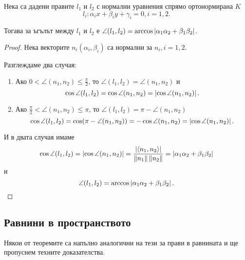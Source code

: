 \documentclass[numbers=endperiod, DIV=15, bibliography=totocnumbered]{scrartcl}
\begin{document}
\begin{theorem}
  Нека са дадени правите $l_1$ и $l_2$ с нормални уравнения спрямо ортонормирана $K$
  \begin{displaymath}
    l_i: \alpha_i x + \beta_i y + \gamma_i = 0, i = 1, 2.
  \end{displaymath}

  Тогава за ъгълът между $l_1$ и $l_2$ е $\angle(l_1, l_2) = \arccos \left\vert \alpha_1 \alpha_2 + \beta_1 \beta_2 \right\vert$.
\end{theorem}
\begin{proof}
  Нека векторите $n_i(\alpha_i, \beta_i)$ са нормални за $n_i, i = 1, 2$.

  Разглеждаме два случая:
  \begin{enumerate}
    \item Ако $0 < \angle(n_1, n_2) \leq \frac {\pi} 2$, то $\angle(l_1, l_2) = \angle(n_1, n_2)$ и
    \begin{displaymath}
      \cos \angle (l_1, l_2)
      =
      \cos \angle(n_1, n_2)
      =
      \left\vert \cos \angle (n_1, n_2) \right\vert.
    \end{displaymath}

    \item Ако $\frac {\pi} 2 < \angle(n_1, n_2) \leq \pi$, то $\angle(l_1, l_2) = \pi - \angle(n_1, n_2)$
    \begin{displaymath}
      \cos \angle (l_1, l_2)
      =
      \cos (\pi - \angle(n_1, n_2))
      =
      -\cos \angle(n_1, n_2)
      =
      \left\vert \cos \angle (n_1, n_2) \right\vert.
    \end{displaymath}
  \end{enumerate}

  И в двата случая имаме
  \begin{displaymath}
    \cos \angle(l_1, l_2)
    =
    \left\vert \cos \angle(n_1, n_2) \right\vert
    =
    \frac {\left\vert \left\langle n_1, n_2 \right\rangle \right\vert} {\left\Vert n_1 \right\Vert \left\Vert n_2 \right\Vert}
    =
    \left\vert \alpha_1 \alpha_2 + \beta_1 \beta_2 \right\vert
  \end{displaymath}
  и
  \begin{displaymath}
    \angle(l_1, l_2)
    =
    \arccos \left\vert \alpha_1 \alpha_2 + \beta_1 \beta_2 \right\vert.
  \end{displaymath}
\end{proof}

\subsection{Равнини в пространството}

\begin{note}
  Някои от теоремите са напълно аналогични на тези за прави в равнината и ще пропуснем техните доказателства.
\end{note}
\end{document}

